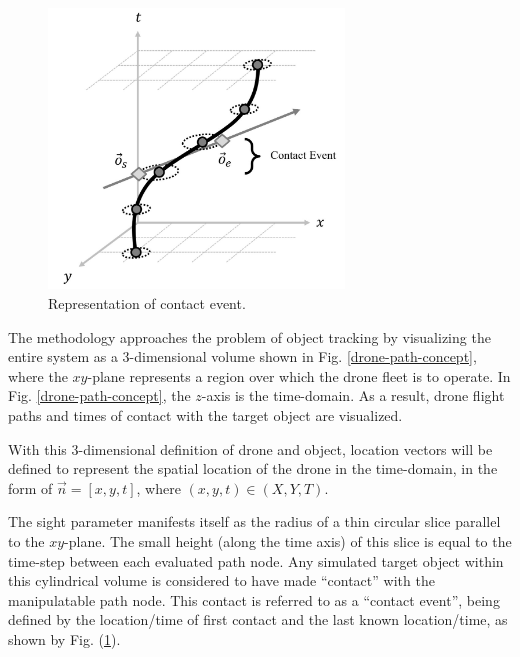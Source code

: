 \documentclass[conf]{new-aiaa}
\begin{document}
\begin{figure}[hbt!]
\centering
\includegraphics[width=0.7\textwidth]{figs/contact-event-concept}
\caption{Representation of contact event.}
\label{contact-event-concept}
\end{figure}

The methodology approaches the problem of object tracking by visualizing the entire system as a 3-dimensional volume shown in Fig. \ref{drone-path-concept}, where the $xy$-plane represents a region over which the drone fleet is to operate. In Fig. \ref{drone-path-concept}, the $z$-axis is the time-domain. As a result, drone flight paths and times of contact with the target object are visualized. 

With this 3-dimensional definition of drone and object, location vectors will be defined to represent the spatial location of the drone in the time-domain, in the form of $\vec{n}=[x, y, t]$, where $(x, y, t) \in (X, Y, T)$.

The sight parameter manifests itself as the radius of a thin circular slice parallel to the $xy$-plane. The small height (along the time axis) of this slice is equal to the time-step between each evaluated path node. Any simulated target object within this cylindrical volume is considered to have made ``contact'' with the manipulatable path node. This contact is referred to as a ``contact event'', being defined by the location/time of first contact and the last known location/time, as shown by Fig. (\ref{contact-event-concept}).



\end{document}
